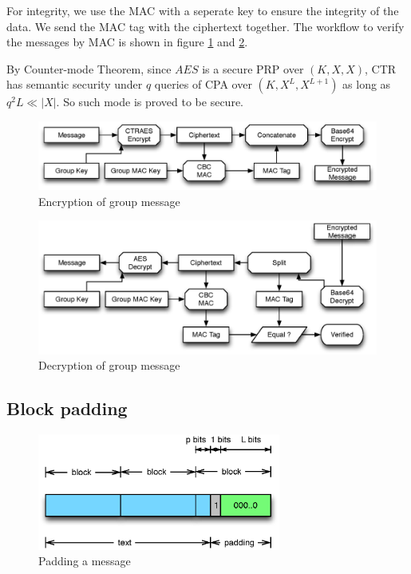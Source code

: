 For integrity, we use the MAC with a seperate key to ensure the integrity of the data. We send the MAC tag with the ciphertext together. The workflow to verify the messages by MAC is shown in figure \ref{fig:msg_enc} and \ref{fig:msg_dec}. 

By Counter-mode Theorem, since $AES$ is a secure PRP over $(K,X,X)$, CTR has semantic security under $q$ queries of CPA over $(K,X^L,X^{L+1})$ as long as $q^2L \ll |X|$. 
So such mode is proved to be secure.

\begin{figure}[h!]
\centering
\caption{Encryption of group message}
\label{fig:msg_enc}
\includegraphics[width=12cm]{fig/msg_enc.eps}
\end{figure}
\begin{figure}[h!]
\centering
\caption{Decryption of group message}
\label{fig:msg_dec}
\includegraphics[width=12cm]{fig/msg_dec.eps}
\end{figure}

\subsection{Block padding}

\begin{figure}[h!]
\centering
\caption{Padding a message}
\label{fig:padding}
\includegraphics[width=8cm]{fig/padding.eps}
\end{figure}

